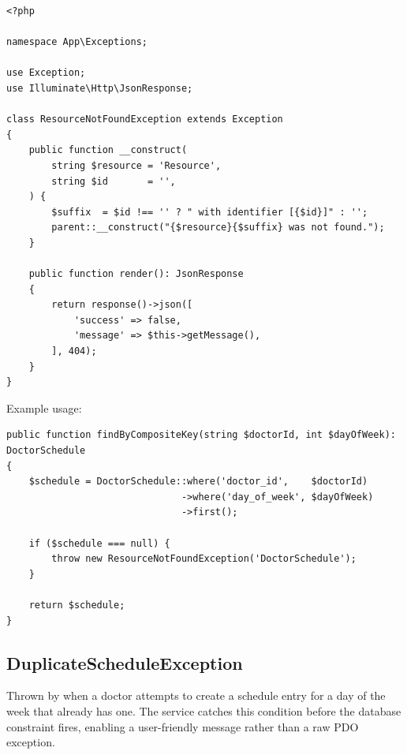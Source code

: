 \begin{lstlisting}[style=php, caption={\texttt{app/Exceptions/ResourceNotFoundException.php}.}]
<?php

namespace App\Exceptions;

use Exception;
use Illuminate\Http\JsonResponse;

class ResourceNotFoundException extends Exception
{
    public function __construct(
        string $resource = 'Resource',
        string $id       = '',
    ) {
        $suffix  = $id !== '' ? " with identifier [{$id}]" : '';
        parent::__construct("{$resource}{$suffix} was not found.");
    }

    public function render(): JsonResponse
    {
        return response()->json([
            'success' => false,
            'message' => $this->getMessage(),
        ], 404);
    }
}
\end{lstlisting}

Example usage:

\begin{lstlisting}[style=php, caption={Manual not-found signal in a repository.}]
public function findByCompositeKey(string $doctorId, int $dayOfWeek): DoctorSchedule
{
    $schedule = DoctorSchedule::where('doctor_id',    $doctorId)
                               ->where('day_of_week', $dayOfWeek)
                               ->first();

    if ($schedule === null) {
        throw new ResourceNotFoundException('DoctorSchedule');
    }

    return $schedule;
}
\end{lstlisting}

\subsection{DuplicateScheduleException}
\label{sec:ex-duplicate-schedule}

Thrown by  when a doctor attempts to
create a schedule entry for a day of the week that already has one.
The service catches this condition before the database constraint fires,
enabling a user-friendly message rather than a raw PDO exception.

